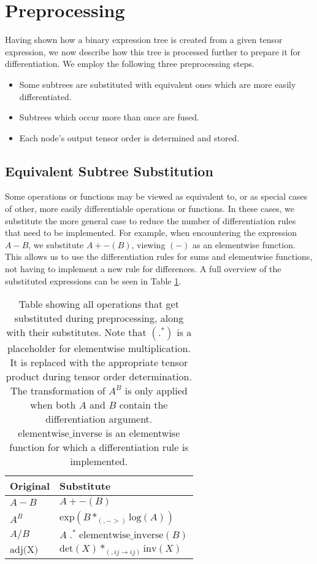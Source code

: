 \documentclass[12pt, a4paper]{report}
\begin{document}
\FloatBarrier
\section{Preprocessing}
Having shown how a binary expression tree is created from a given tensor expression, we now describe how this tree is processed further to prepare it for differentiation.
We employ the following three preprocessing steps.
\begin{itemize}
    \item Some subtrees are substituted with equivalent ones which are more easily differentiated.
    \item Subtrees which occur more than once are fused.
    \item Each node's output tensor order is determined and stored.
\end{itemize}

\subsection{Equivalent Subtree Substitution}
Some operations or functions may be viewed as equivalent to, or as special cases of other, more easily differentiable operations or functions.
In these cases, we substitute the more general case to reduce the number of differentiation rules that need to be implemented.
For example, when encountering the expression $A - B$, we substitute $A + -(B)$, viewing $(-)$ as an elementwise function.
This allows us to use the differentiation rules for sums and elementwise functions, not having to implement a new rule for differences.
A full overview of the substituted expressions can be seen in Table \ref{tab:substitutions}.
\begin{table}[ht]
    \centering
    \begin{tabular}{l | l}
        Original & Substitute \\\hline
        $A-B$ & $A + -(B)$ \\
        $A^B$ & $\text{exp}(B *_{(,->)} \text{log}(A))$ \\ %
        $A/B$ & $A \;.^*\; \text{elementwise\_inverse}(B)$ \\
        $\text{adj(X)}$ & $\text{det}(X) *_{(,ij \rightarrow ij)} \text{inv}(X)$ \\ 
    \end{tabular}
    \caption{Table showing all operations that get substituted during preprocessing, along with their substitutes. Note that $(.^*)$ is a placeholder for elementwise multiplication. It is replaced with the appropriate tensor product during tensor order determination. The transformation of $A^B$ is only applied when both $A$ and $B$ contain the differentiation argument. $\text{elementwise\_inverse}$ is an elementwise function for which a differentiation rule is implemented.}
    \label{tab:substitutions}
\end{table}
\FloatBarrier
\end{document}
